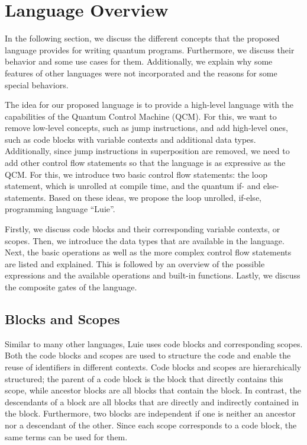 \section{Language Overview}
In the following section, we discuss the different concepts that the proposed language provides for writing quantum programs. Furthermore, we discuss their behavior and some use cases for them. Additionally, we explain why some features of other languages were not incorporated and the reasons for some special behaviors. 

The idea for our proposed language is to provide a high-level language with the capabilities of the Quantum Control Machine (QCM). For this, we want to remove low-level concepts, such as jump instructions, and add high-level ones, such as code blocks with variable contexts and additional data types. Additionally, since jump instructions in superposition are removed, we need to add other control flow statements so that the language is as expressive as the QCM. For this, we introduce two basic control flow statements: the loop statement, which is unrolled at compile time, and the quantum if- and else-statements. Based on these ideas, we propose the loop unrolled, if-else, programming language ``Luie''.

Firstly, we discuss code blocks and their corresponding variable contexts, or scopes. Then, we introduce the data types that are available in the language. Next, the basic operations as well as the more complex control flow statements are listed and explained. This is followed by an overview of the possible expressions and the available operations and built-in functions. Lastly, we discuss the composite gates of the language. 


\subsection{Blocks and Scopes}
\label{sec:concept_blocksAndScope}
Similar to many other languages, Luie uses code blocks and corresponding scopes. Both the code blocks and scopes are used to structure the code and enable the reuse of identifiers in different contexts. Code blocks and scopes are hierarchically structured; the parent of a code block is the block that directly contains this scope, while ancestor blocks are all blocks that contain the block.
In contrast, the descendants of a block are all blocks that are directly and indirectly contained in the block. Furthermore, two blocks are independent if one is neither an ancestor nor a descendant of the other. Since each scope corresponds to a code block, the same terms can be used for them.

